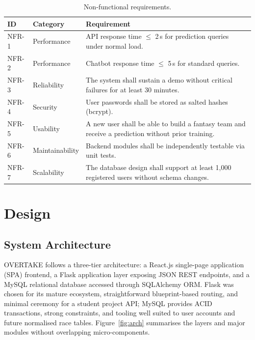 \documentclass[12pt, a4paper, oneside]{report}
\begin{document}
\begin{table}[H]
\centering
\caption{Non-functional requirements.}
\label{tab:nfr}
\begin{tabularx}{\textwidth}{@{} l l X @{}}
  \toprule
  \textbf{ID} & \textbf{Category}   & \textbf{Requirement} \\
  \midrule
  NFR-1 & Performance     & API response time $\leq$ 2\,s for prediction
                            queries under normal load. \\
  NFR-2 & Performance     & Chatbot response time $\leq$ 5\,s for standard
                            queries. \\
  NFR-3 & Reliability     & The system shall sustain a demo without critical
                            failures for at least 30 minutes. \\
  NFR-4 & Security        & User passwords shall be stored as salted hashes
                            (bcrypt). \\
  NFR-5 & Usability       & A new user shall be able to build a fantasy team
                            and receive a prediction without prior training. \\
  NFR-6 & Maintainability & Backend modules shall be independently testable
                            via unit tests. \\
  NFR-7 & Scalability     & The database design shall support at least
                            1{,}000 registered users without schema changes. \\
  \bottomrule
\end{tabularx}
\end{table}

\chapter{Design}

\section{System Architecture}

OVERTAKE follows a three-tier architecture: a React.js single-page application
(SPA) frontend, a Flask application layer exposing JSON REST endpoints, and a
MySQL relational database accessed through SQLAlchemy ORM. Flask was chosen for
its mature ecosystem, straightforward blueprint-based routing, and minimal
ceremony for a student project API; MySQL provides ACID transactions, strong
constraints, and tooling well suited to user accounts and future normalised
race tables. Figure~\ref{fig:arch} summarises the layers and major modules
without overlapping micro-components.
\end{document}
